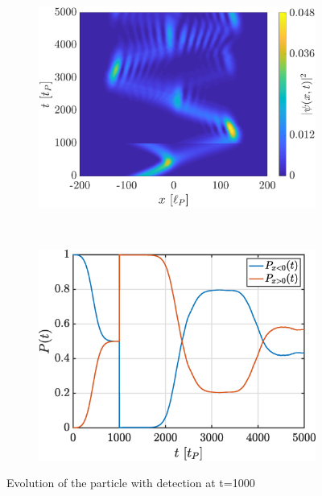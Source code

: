 \documentclass[a4paper,12pt,twoside]{article}
\begin{document}
\begin{figure}[h]
        \centering
        \begin{subfigure}[t]{0.45\textwidth}
          \includegraphics[width=\textwidth]{graphs/iv_det_Evo.eps}
          \caption{}
          \label{fig:iv_det_Evo}
        \end{subfigure}
        ~
        \begin{subfigure}[t]{0.45\textwidth}
          \includegraphics[width=\textwidth]{graphs/iv_det_Prob.eps}
          \caption{}
          \label{fig:iv_det_Prob}
        \end{subfigure}
        \caption{Evolution of the particle with detection at t=1000}
        \label{fig:iv_det}
\end{figure}
\end{document}
